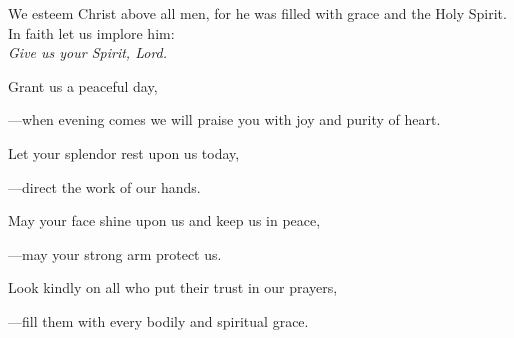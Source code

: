 \intercessions\indent

\begin{hangpar}

We esteem Christ above all men, for he was filled with grace and the Holy Spirit. In faith let us implore him:\\
\emph{Give us your Spirit, Lord.}

\medskip Grant us a peaceful day,

{\color{red}---\thinspace}when evening comes we will praise you with joy and purity of heart.

\medskip Let your splendor rest upon us today,

{\color{red}---\thinspace}direct the work of our hands.

\medskip May your face shine upon us and keep us in peace,

{\color{red}---\thinspace}may your strong arm protect us.

\medskip Look kindly on all who put their trust in our prayers,

{\color{red}---\thinspace}fill them with every bodily and spiritual grace.

\end{hangpar}

